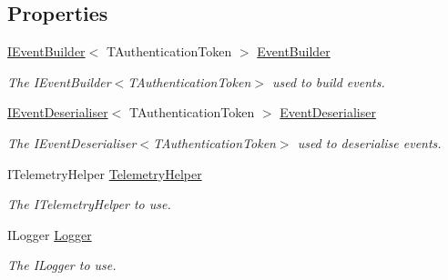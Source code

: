 \subsection*{Properties}
\begin{DoxyCompactItemize}
\item 
\hyperlink{interfaceCqrs_1_1Events_1_1IEventBuilder}{I\+Event\+Builder}$<$ T\+Authentication\+Token $>$ \hyperlink{classCqrs_1_1Events_1_1EventStore_a05393aedf2eae4b2eeae3977e7f1c6f9_a05393aedf2eae4b2eeae3977e7f1c6f9}{Event\+Builder}
\begin{DoxyCompactList}\small\item\em The I\+Event\+Builder$<$\+T\+Authentication\+Token$>$ used to build events. \end{DoxyCompactList}\item 
\hyperlink{interfaceCqrs_1_1Events_1_1IEventDeserialiser}{I\+Event\+Deserialiser}$<$ T\+Authentication\+Token $>$ \hyperlink{classCqrs_1_1Events_1_1EventStore_a24f17302c069058e5814dedfb614d599_a24f17302c069058e5814dedfb614d599}{Event\+Deserialiser}
\begin{DoxyCompactList}\small\item\em The I\+Event\+Deserialiser$<$\+T\+Authentication\+Token$>$ used to deserialise events. \end{DoxyCompactList}\item 
I\+Telemetry\+Helper \hyperlink{classCqrs_1_1Events_1_1EventStore_a75d6d3ad3a26fb9b511e2a98e72260f9_a75d6d3ad3a26fb9b511e2a98e72260f9}{Telemetry\+Helper}
\begin{DoxyCompactList}\small\item\em The I\+Telemetry\+Helper to use. \end{DoxyCompactList}\item 
I\+Logger \hyperlink{classCqrs_1_1Events_1_1EventStore_a99506f7136a658364f8b74ef6a779a3f_a99506f7136a658364f8b74ef6a779a3f}{Logger}
\begin{DoxyCompactList}\small\item\em The I\+Logger to use. \end{DoxyCompactList}\end{DoxyCompactItemize}


